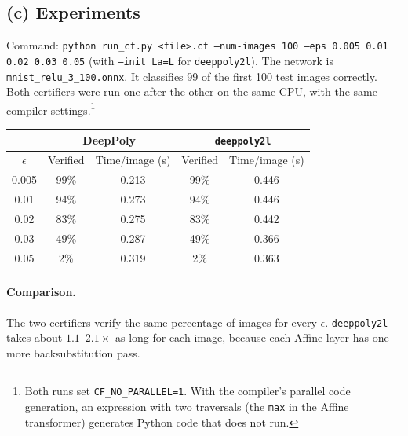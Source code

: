 \subsection*{(c) Experiments}

Command: \texttt{python run\_cf.py <file>.cf --num-images 100
--eps 0.005 0.01 0.02 0.03 0.05} (with \texttt{--init La=L} for
\texttt{deeppoly2l}). The network is \texttt{mnist\_relu\_3\_100.onnx}.
It classifies 99 of the first 100 test images correctly.
Both certifiers were run one after the other on the same CPU, with the
same compiler settings.\footnote{Both runs set
\texttt{CF\_NO\_PARALLEL=1}. With the compiler's parallel code generation,
an expression with two traversals (the \texttt{max} in the Affine
transformer) generates Python code that does not run.}

\begin{center}
\begin{tabular}{|c|c|c|c|c|}
\hline
 & \multicolumn{2}{c|}{DeepPoly} & \multicolumn{2}{c|}{\texttt{deeppoly2l}} \\
\hline
$\epsilon$ & Verified & Time/image (s) & Verified & Time/image (s) \\
\hline
0.005 & 99\% & 0.213 & 99\% & 0.446 \\
0.01  & 94\% & 0.273 & 94\% & 0.446 \\
0.02  & 83\% & 0.275 & 83\% & 0.442 \\
0.03  & 49\% & 0.287 & 49\% & 0.366 \\
0.05  &  2\% & 0.319 &  2\% & 0.363 \\
\hline
\end{tabular}
\end{center}

\paragraph{Comparison.}
The two certifiers verify the same percentage of images for every
$\epsilon$. \texttt{deeppoly2l} takes about $1.1$--$2.1\times$ as long
for each image, because each Affine layer has one more
backsubstitution pass.

